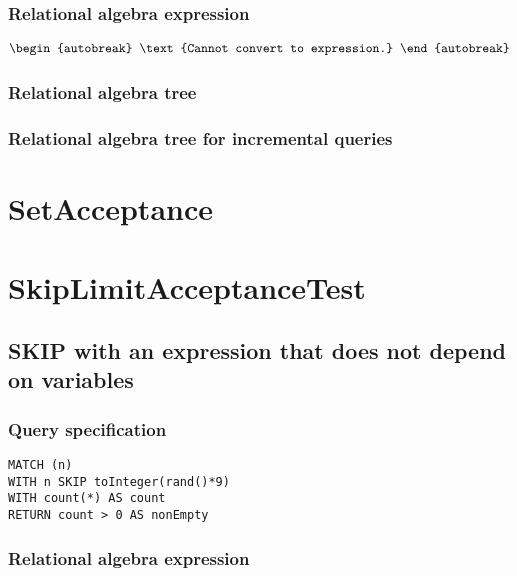 \subsubsection*{Relational algebra expression}

\begin{align*}
\begin{autobreak}
\text{Cannot convert to expression.}
\end{autobreak}
\end{align*}

\subsubsection*{Relational algebra tree}


\subsubsection*{Relational algebra tree for incremental queries}

\section{SetAcceptance}

\section{SkipLimitAcceptanceTest}


\subsection{SKIP with an expression that does not depend on variables}

\subsubsection*{Query specification}

\begin{lstlisting}
MATCH (n)
WITH n SKIP toInteger(rand()*9)
WITH count(*) AS count
RETURN count > 0 AS nonEmpty
\end{lstlisting}

\subsubsection*{Relational algebra expression}

